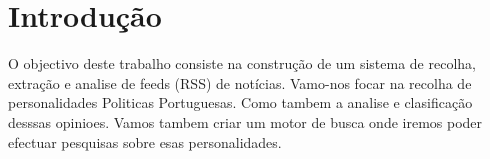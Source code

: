 \section{Introdução}
\hspace{15pt}O objectivo deste trabalho consiste na construção de um sistema de recolha, extração e analise de feeds (RSS) de notícias. Vamo-nos focar na recolha de personalidades Politicas Portuguesas. Como tambem a analise e clasificação desssas opinioes. Vamos tambem criar um motor de busca onde iremos poder efectuar pesquisas sobre esas personalidades.
